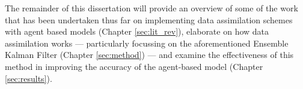 The remainder of this dissertation will provide an overview of some of the work
that has been undertaken thus far on implementing data assimilation schemes with
agent based models (Chapter \ref{sec:lit_rev}), elaborate on how data
assimilation works --- particularly focussing on the aforementioned Ensemble Kalman
Filter (Chapter \ref{sec:method}) --- and examine the effectiveness of this
method in improving the accuracy of the agent-based model (Chapter
\ref{sec:results}).
